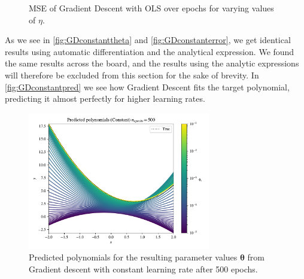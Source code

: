 \documentclass{article}
\theoremstyle{definition}
\begin{document}
\begin{figure}[ht]%
    \centering
    \qquad
    \caption{MSE of Gradient Descent with OLS over epochs for varying values of $\eta$.}%
    \label{fig:GDconstanterror}%
\end{figure}

As we see in \autoref{fig:GDconstanttheta} and \autoref{fig:GDconstanterror}, we get identical results using automatic differentiation and the analytical expression. We found the same results across the board, and the results using the analytic expressions will therefore be excluded from this section for the sake of brevity. In \autoref{fig:GDconstantpred} we see how Gradient Descent fits the target polynomial, predicting it almost perfectly for higher learning rates.

\begin{figure}[H]%
    \centering
    \includegraphics[width=8cm]{Project2/figures/polynomial_grad/OLS_autodiff/constant_prediction.pdf}
    \caption{Predicted polynomials for the resulting parameter values $\boldsymbol{\theta}$ from Gradient descent with constant learning rate after 500 epochs.}
    \label{fig:GDconstantpred}
\end{figure}
\end{document}
